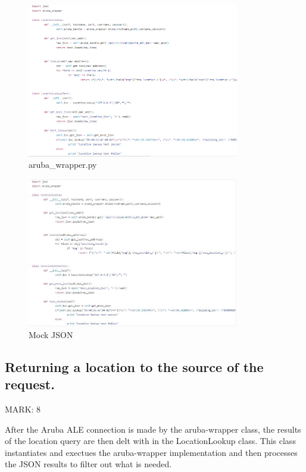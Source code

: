 \documentclass{article}
\begin{document}
\begin{figure}[ht]
  \includegraphics[width=350px]{Images/getLoc.PNG}
  \caption{aruba\_wrapper.py}
  \label{fig:aruba\_wrapper.py}
\end{figure}
\begin{figure}[ht]
  \includegraphics[width=350px]{Images/LocLookup.JPG}
  \caption{Mock JSON}

\label{Mock JSON}
\end{figure}


\subsection{Returning a location to the source of the request.}
\begin{flushleft}
MARK: 8
\end{flushleft}

\begin{flushleft}
After the Aruba ALE connection is made by the aruba-wrapper class, the results of the location query are then delt with in the LocationLookup class. This class instantiates and exectues the aruba-wrapper implementation and then processes the JSON results to filter out what is needed. 
\end{flushleft}
\end{document}
